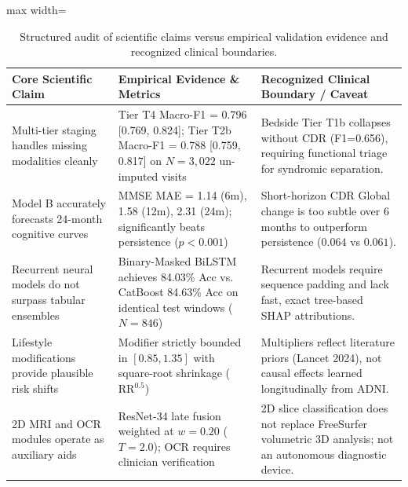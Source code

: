 \begin{table}[t]
\centering
\caption{Structured audit of scientific claims versus empirical validation evidence and recognized clinical boundaries.}
\label{tab:claims_vs_evidence}
\small
\begin{adjustbox}{max width=\linewidth}
\begin{tabular}{p{3.2cm}p{5.5cm}p{6.5cm}}
\toprule
\textbf{Core Scientific Claim} & \textbf{Empirical Evidence \& Metrics} & \textbf{Recognized Clinical Boundary / Caveat} \\
\midrule
Multi-tier staging handles missing modalities cleanly & Tier T4 Macro-F1 = 0.796 [0.769, 0.824]; Tier T2b Macro-F1 = 0.788 [0.759, 0.817] on $N=3,022$ un-imputed visits & Bedside Tier T1b collapses without CDR (F1=0.656), requiring functional triage for syndromic separation. \\
Model B accurately forecasts 24-month cognitive curves & MMSE MAE = 1.14 (6m), 1.58 (12m), 2.31 (24m); significantly beats persistence ($p < 0.001$) & Short-horizon CDR Global change is too subtle over 6 months to outperform persistence ($0.064$ vs $0.061$). \\
Recurrent neural models do not surpass tabular ensembles & Binary-Masked BiLSTM achieves 84.03\% Acc vs. CatBoost 84.63\% Acc on identical test windows ($N=846$) & Recurrent models require sequence padding and lack fast, exact tree-based SHAP attributions. \\
Lifestyle modifications provide plausible risk shifts & Modifier strictly bounded in $[0.85, 1.35]$ with square-root shrinkage ($\text{RR}^{0.5}$) & Multipliers reflect literature priors (Lancet 2024), not causal effects learned longitudinally from ADNI. \\
2D MRI and OCR modules operate as auxiliary aids & ResNet-34 late fusion weighted at $w=0.20$ ($T=2.0$); OCR requires clinician verification & 2D slice classification does not replace FreeSurfer volumetric 3D analysis; not an autonomous diagnostic device. \\
\bottomrule
\end{tabular}
\end{adjustbox}
\end{table}
